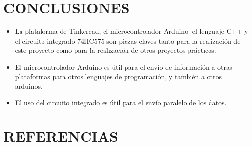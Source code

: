 \documentclass{article}
\begin{document}
\section{CONCLUSIONES} \label{conclulsion}
\begin{itemize}
\item La plataforma de Tinkercad, el microcontrolador Arduino, el lenguaje C++ y el circuito integrado 74HC575 son piezas claves tanto para la realización de este proyecto como para la realización de otros proyectos prácticos.
\item El microcontrolador Arduino es útil para el envío de información a otras plataformas para otros lenguajes de programación, y también a otros arduinos.
\item El uso del circuito integrado es útil para el envío paralelo de los datos.

\end{itemize}

\section{REFERENCIAS}    




\end{document}
